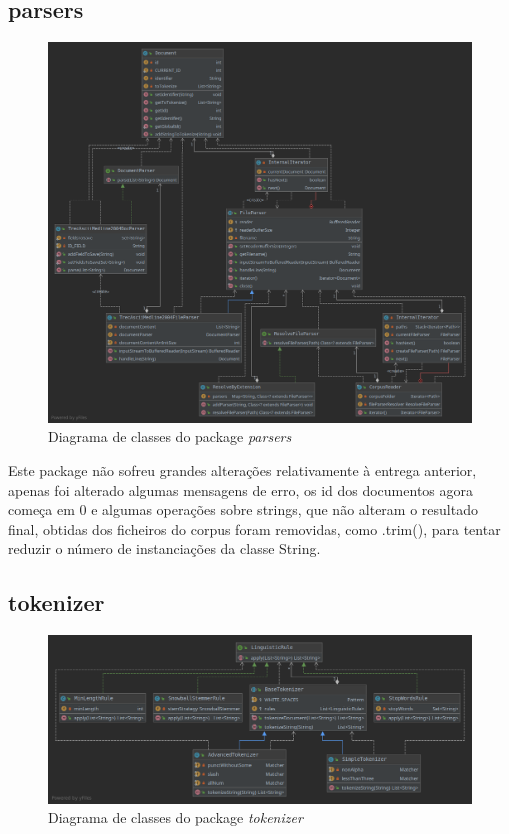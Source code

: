 \documentclass[12pt]{article}
\begin{document}
\subsection{parsers}
\begin{figure}[H]
  \center
  \includegraphics[width=\linewidth]{packages_parsers}
  \caption{Diagrama de classes do package \it parsers}
\end{figure}

Este package não sofreu grandes alterações relativamente à entrega
anterior, apenas foi alterado algumas mensagens de erro, os id dos
documentos agora começa em 0 e algumas operações sobre strings,
que não alteram o resultado final, obtidas dos ficheiros do corpus
foram removidas, como .trim(), para tentar reduzir o número de
instanciações da classe String.

\subsection{tokenizer}
\begin{figure}[H]
  \center
  \includegraphics[width=\linewidth]{packages_tokenizer.png}
  \caption{Diagrama de classes do package \it tokenizer}
\end{figure}
\end{document}
